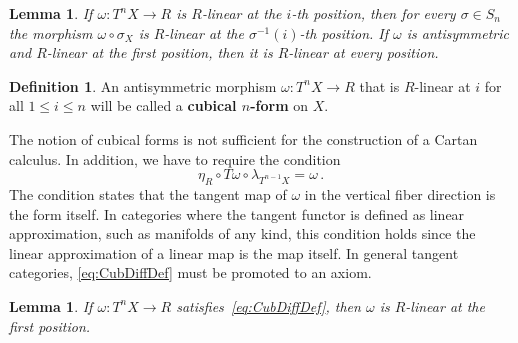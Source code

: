\documentclass[12pt,reqno, a4paper]{amsart}
\numberwithin{equation}{section}
\theoremstyle{plain}
\newtheorem{Lemma}[Theorem]{Lemma}
\theoremstyle{definition}
\newtheorem{Definition}[Theorem]{Definition}
\theoremstyle{remark}
\newcommand{\Val}{\eta}
\begin{document}
\begin{Lemma}
\label{lem:AtiPermute}
If $\omega: T^n X \to R$ is $R$-linear at the $i$-th position, then for every $\sigma \in S_n$ the morphism $\omega \circ \sigma_X$ is $R$-linear at the $\sigma^{-1}(i)$-th position. If $\omega$ is antisymmetric and $R$-linear at the first position, then it is $R$-linear at every position.
\end{Lemma}

\begin{Definition}
\label{def:CubeForms1}
An antisymmetric morphism $\omega\colon T^n X \to R$ that is $R$-linear at $i$ for all $1 \leq i \leq n$ will be called a \textbf{cubical $n$-form} on $X$.
\end{Definition}

The notion of cubical forms is not sufficient for the construction of a Cartan calculus. In addition, we have to require the condition
\begin{equation}
\label{eq:CubDiffDef}
  \Val_R \circ T\omega \circ \lambda_{T^{n-1}X} =  \omega
  \,.
\end{equation}
The condition states that the tangent map of $\omega$ in the vertical fiber direction is the form itself. In categories where the tangent functor is defined as linear approximation, such as manifolds of any kind, this condition holds since the linear approximation of a linear map is the map itself. In general tangent categories, \eqref{eq:CubDiffDef} must be promoted to an axiom.

\begin{Lemma}
\label{lem:DiffImpliesLin}
If $\omega: T^n X \to R$ satisfies~\eqref{eq:CubDiffDef}, then $\omega$ is $R$-linear at the first position.
\end{Lemma}
\end{document}
